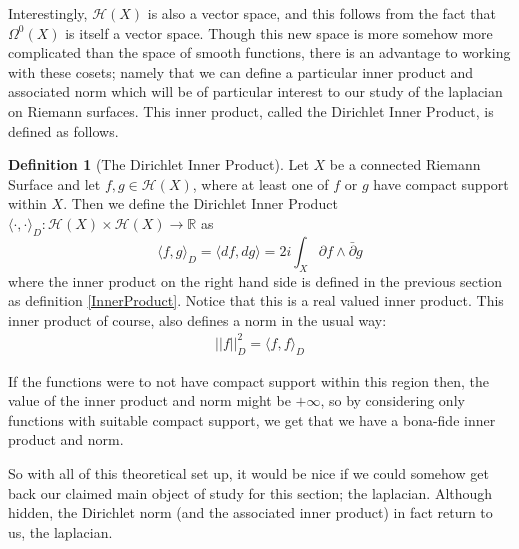 \documentclass[a4paper,12pt]{report}
\theoremstyle{plain}
\theoremstyle{definition}
\newtheorem{defn}[thm]{Definition}
\begin{document}
Interestingly, $\mathcal{H}(X)$ is also a vector space, and this follows from the fact that $\Omega^0(X)$ is itself a vector space. Though this new space is more somehow more complicated than the space of smooth functions, there is an advantage to working with these cosets; namely that we can define a particular inner product and associated norm which will be of particular interest to our study of the laplacian on Riemann surfaces. This inner product, called the Dirichlet Inner Product, is defined as follows.

\begin{defn}[The Dirichlet Inner Product]\label{dInnerProduct}
  Let $X$ be a connected Riemann Surface and let $f, g \in \mathcal{H}(X)$, where at least one of $f$ or $g$ have compact support within $X$. Then we define the Dirichlet Inner Product $\langle \cdot, \cdot \rangle_D : \mathcal{H}(X) \times \mathcal{H}(X) \rightarrow \mathbb{R}$ as 
  \[
    \langle f, g \rangle_D =\langle df, dg \rangle = 2i \int_X \partial f \wedge \bar{\partial} g 
  \]
  where the inner product on the right hand side is defined in the previous section as definition \ref{InnerProduct}. Notice that this is a real valued inner product.
  This inner product of course, also defines a norm in the usual way:
  \begin{align*}
    ||f||_D^2 = \langle f, f \rangle_D
  \end{align*}
\end{defn}

If the functions were to not have compact support within this region then, the value of the inner product and norm might be $+\infty$, so by considering only functions with suitable compact support, we get that we have a bona-fide inner product and norm.

So with all of this theoretical set up, it would be nice if we could somehow get back our claimed main object of study for this section; the laplacian. Although hidden, the Dirichlet norm (and the associated inner product) in fact return to us, the laplacian.
\end{document}
